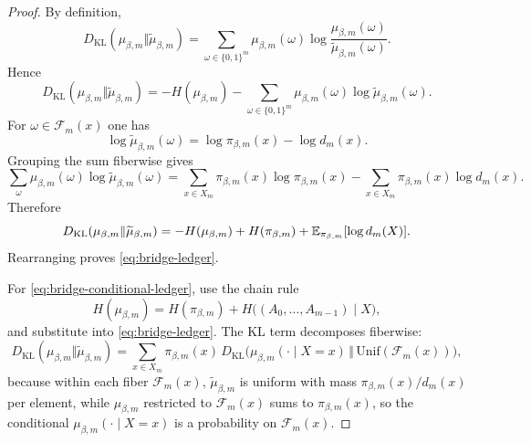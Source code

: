 \begin{proof}
By definition,
\[
D_{\mathrm{KL}}(\mu_{\beta,m}\Vert \widetilde\mu_{\beta,m})
=
\sum_{\omega\in\{0,1\}^m}
\mu_{\beta,m}(\omega)\log\frac{\mu_{\beta,m}(\omega)}{\widetilde\mu_{\beta,m}(\omega)}.
\]
Hence
\[
D_{\mathrm{KL}}(\mu_{\beta,m}\Vert \widetilde\mu_{\beta,m})
=
-H(\mu_{\beta,m})
-
\sum_{\omega\in\{0,1\}^m}
\mu_{\beta,m}(\omega)\log \widetilde\mu_{\beta,m}(\omega).
\]
For $\omega\in\mathcal F_m(x)$ one has
\[
\log \widetilde\mu_{\beta,m}(\omega)=\log \pi_{\beta,m}(x)-\log d_m(x).
\]
Grouping the sum fiberwise gives
\[
\sum_{\omega}
\mu_{\beta,m}(\omega)\log \widetilde\mu_{\beta,m}(\omega)
=
\sum_{x\in X_m}\pi_{\beta,m}(x)\log \pi_{\beta,m}(x)
-
\sum_{x\in X_m}\pi_{\beta,m}(x)\log d_m(x).
\]
Therefore
\[
D_{\mathrm{KL}}(\mu_{\beta,m}\Vert \widetilde\mu_{\beta,m})
=
-H(\mu_{\beta,m})
+
H(\pi_{\beta,m})
+
\mathbb{E}_{\pi_{\beta,m}}[\log d_m(X)].
\]
Rearranging proves \eqref{eq:bridge-ledger}.

For \eqref{eq:bridge-conditional-ledger}, use the chain rule
\[
H(\mu_{\beta,m})=H(\pi_{\beta,m})+H\bigl((A_0,\dots,A_{m-1})\mid X\bigr),
\]
and substitute into \eqref{eq:bridge-ledger}. The KL term decomposes fiberwise:
\[
D_{\mathrm{KL}}(\mu_{\beta,m}\Vert\widetilde\mu_{\beta,m})
=
\sum_{x\in X_m}\pi_{\beta,m}(x)\,
D_{\mathrm{KL}}\bigl(\mu_{\beta,m}(\cdot\mid X=x)\,\Vert\,\mathrm{Unif}(\mathcal F_m(x))\bigr),
\]
because within each fiber $\mathcal F_m(x)$, $\widetilde\mu_{\beta,m}$ is uniform with mass $\pi_{\beta,m}(x)/d_m(x)$ per element, while $\mu_{\beta,m}$ restricted to $\mathcal F_m(x)$ sums to $\pi_{\beta,m}(x)$, so the conditional $\mu_{\beta,m}(\cdot\mid X=x)$ is a probability on $\mathcal F_m(x)$.
\end{proof}

